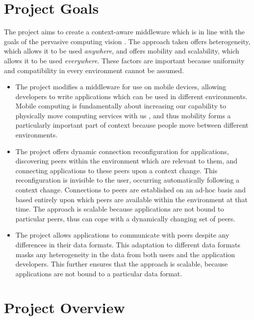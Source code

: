 \documentclass[12pt,twoside,notitlepage]{report}
\begin{document}
\section{Project Goals}

The project aims to create a context-aware middleware which is in line with the goals of the pervasive computing vision \cite{weiser1991computer}. 
The approach taken offers heterogeneity, which allows it to be used {\sl anywhere}, and offers mobility and scalability, which allows it to be used {\sl everywhere}. 
These factors are important because uniformity and compatibility in every environment cannot be assumed. 

\begin{itemize}

\item
The project modifies a middleware for use on mobile devices, allowing developers to write applications which can be used in different environments. 
Mobile computing is fundamentally about increasing our capability to physically move computing services with us \cite{lyytinen2002ubiquitous}, and thus mobility forms a particularly important part of context because people move between different environments. 

\item
The project offers dynamic connection reconfiguration for applications, discovering peers within the environment which are relevant to them, and connecting applications to these peers upon a context change. 
This reconfiguration is invisible to the user, occurring automatically following a context change. 
Connections to peers are established on an ad-hoc basis and based entirely upon which peers are available within the environment at that time. 
The approach is scalable because applications are not bound to particular peers, thus can cope with a dynamically changing set of peers. 

\item
The project allows applications to communicate with peers despite any differences in their data formats. 
This adaptation to different data formats masks any heterogeneity in the data \cite{saha2003pervasive} from both users and the application developers. 
This further ensures that the approach is scalable, because applications are not bound to a particular data format. 

\end{itemize}


\section{Project Overview}
\end{document}
